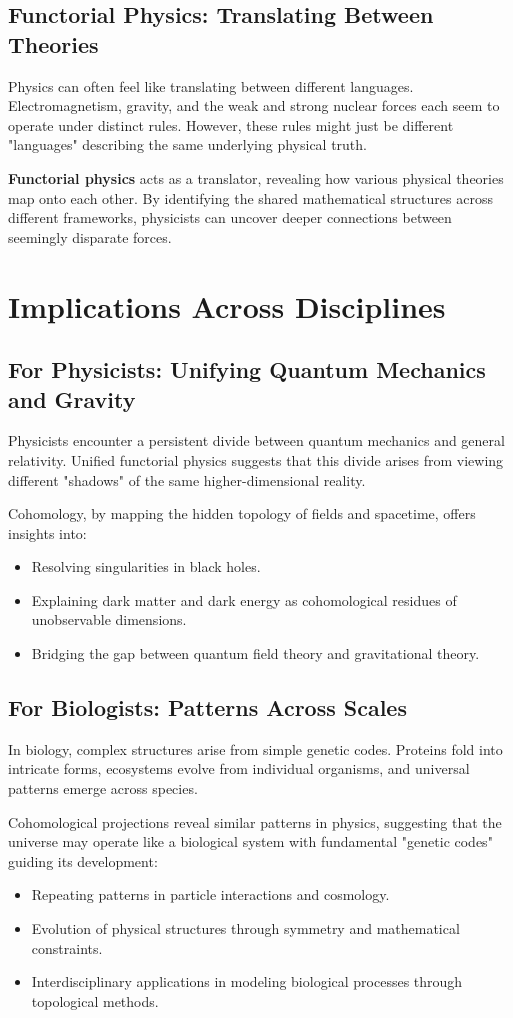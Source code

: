 \documentclass{article}
\begin{document}
\subsection{Functorial Physics: Translating Between Theories}
Physics can often feel like translating between different languages. Electromagnetism, gravity, and the weak and strong nuclear forces each seem to operate under distinct rules. However, these rules might just be different "languages" describing the same underlying physical truth.

\textbf{Functorial physics} acts as a translator, revealing how various physical theories map onto each other. By identifying the shared mathematical structures across different frameworks, physicists can uncover deeper connections between seemingly disparate forces.

\section{Implications Across Disciplines}
\subsection{For Physicists: Unifying Quantum Mechanics and Gravity}
Physicists encounter a persistent divide between quantum mechanics and general relativity. Unified functorial physics suggests that this divide arises from viewing different "shadows" of the same higher-dimensional reality. 

Cohomology, by mapping the hidden topology of fields and spacetime, offers insights into:
\begin{itemize}
    \item Resolving singularities in black holes.
    \item Explaining dark matter and dark energy as cohomological residues of unobservable dimensions.
    \item Bridging the gap between quantum field theory and gravitational theory.
\end{itemize}

\subsection{For Biologists: Patterns Across Scales}
In biology, complex structures arise from simple genetic codes. Proteins fold into intricate forms, ecosystems evolve from individual organisms, and universal patterns emerge across species. 

Cohomological projections reveal similar patterns in physics, suggesting that the universe may operate like a biological system with fundamental "genetic codes" guiding its development:
\begin{itemize}
    \item Repeating patterns in particle interactions and cosmology.
    \item Evolution of physical structures through symmetry and mathematical constraints.
    \item Interdisciplinary applications in modeling biological processes through topological methods.
\end{itemize}
\end{document}
